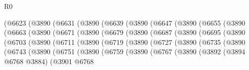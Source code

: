 \begin{lexlean}{R0}
\begin{coremodule}
          (@6623
            (@3890
              (@6631
                (@3890
                  (@6639
                    (@3890
                      (@6647
                        (@3890
                          (@6655
                            (@3890
                              (@6663
                                (@3890
                                  (@6671
                                    (@3890
                                      (@6679
                                        (@3890
                                          (@6687
                                            (@3890
                                              (@6695
                                                (@3890
                                                  (@6703
                                                    (@3890
                                                      (@6711
                                                        (@3890
                                                          (@6719
                                                            (@3890
                                                              (@6727
                                                                (@3890
                                                                  (@6735
                                                                    (@3890
                                                                      (@6743
                                                                        (@3890
                                                                          (@6751
                                                                            (@3890
                                                                              (@6759
                                                                                (@3890
                                                                                  (@6767
                                                                                    (@3890
                                                                                      (@3892
                                                                                        (@3894
                                                                                          @6768
                                                                                          @3884)
                                                                                        (@3901
                                                                                          @6768

\end{coremodule}
\end{lexlean}
